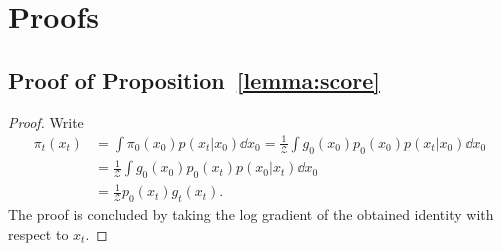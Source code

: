 \documentclass{article}
\theoremstyle{plain}
\theoremstyle{definition}
\theoremstyle{remark}
\begin{document}
\section{Proofs}
\label{apx:proofs}

\subsection{Proof of Proposition~\ref{lemma:score}}
\label{proof_lemma_score}
\begin{proof}
	Write
	\newcommand{\inverseZ}{\frac{1}{\mathcal Z}}
	\begin{equation}
		\begin{split}
			\pi_t(x_t) &= \int \pi_0(x_0) p(x_t|x_0) \dd x_0 = \inverseZ \int g_0(x_0) p_0(x_0) p(x_t|x_0) \dd x_0 \\
			&= \inverseZ \int g_0(x_0) p_0(x_t) p(x_0|x_t) \dd x_0 \\
			&= \inverseZ p_0(x_t) g_t(x_t).
		\end{split}
	\end{equation}
	The proof is concluded by taking the log gradient of the obtained identity with respect to $x_t$.
\end{proof}
\end{document}
